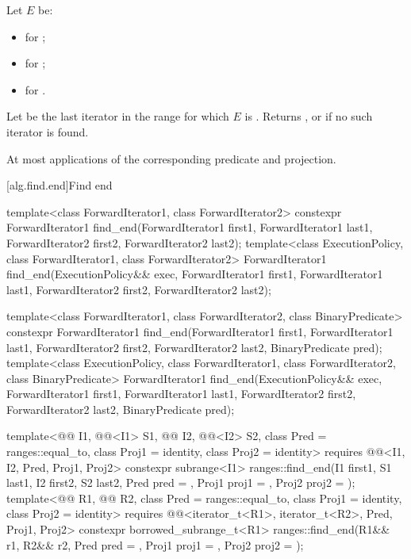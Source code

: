 \begin{itemdescr}
\pnum
Let $E$ be:
\begin{itemize}
\item
{} for ;
\item
{} for ;
\item
{} for .
\end{itemize}

\pnum
\returns
Let  be the last iterator in the range 
for which $E$ is .
Returns , or
 if no such iterator is found.

\pnum
\complexity
At most  applications of
the corresponding predicate and projection.
\end{itemdescr}

[alg.find.end]{Find end}

%
\begin{itemdecl}
template<class ForwardIterator1, class ForwardIterator2>
  constexpr ForwardIterator1
    find_end(ForwardIterator1 first1, ForwardIterator1 last1,
             ForwardIterator2 first2, ForwardIterator2 last2);
template<class ExecutionPolicy, class ForwardIterator1, class ForwardIterator2>
  ForwardIterator1
    find_end(ExecutionPolicy&& exec,
             ForwardIterator1 first1, ForwardIterator1 last1,
             ForwardIterator2 first2, ForwardIterator2 last2);

template<class ForwardIterator1, class ForwardIterator2,
         class BinaryPredicate>
  constexpr ForwardIterator1
    find_end(ForwardIterator1 first1, ForwardIterator1 last1,
             ForwardIterator2 first2, ForwardIterator2 last2,
             BinaryPredicate pred);
template<class ExecutionPolicy, class ForwardIterator1, class ForwardIterator2,
         class BinaryPredicate>
  ForwardIterator1
    find_end(ExecutionPolicy&& exec,
             ForwardIterator1 first1, ForwardIterator1 last1,
             ForwardIterator2 first2, ForwardIterator2 last2,
             BinaryPredicate pred);

template<@@ I1, @@<I1> S1, @@ I2, @@<I2> S2,
         class Pred = ranges::equal_to, class Proj1 = identity, class Proj2 = identity>
  requires @@<I1, I2, Pred, Proj1, Proj2>
  constexpr subrange<I1>
    ranges::find_end(I1 first1, S1 last1, I2 first2, S2 last2, Pred pred = {},
                     Proj1 proj1 = {}, Proj2 proj2 = {});
template<@@ R1, @@ R2,
         class Pred = ranges::equal_to, class Proj1 = identity, class Proj2 = identity>
  requires @@<iterator_t<R1>, iterator_t<R2>, Pred, Proj1, Proj2>
  constexpr borrowed_subrange_t<R1>
    ranges::find_end(R1&& r1, R2&& r2, Pred pred = {},
                     Proj1 proj1 = {}, Proj2 proj2 = {});
\end{itemdecl}

